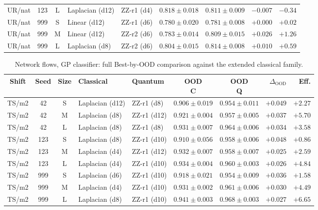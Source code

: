 \documentclass[journal]{IEEEtran}
\begin{document}
\begin{table}[!t]
\begin{tabular}{@{}ccc ll cc rr@{}}
UR/nat & 123 & L & Laplacian (d12) & ZZ-r1 (d4) & $0.818\pm0.018$ & $0.811\pm0.009$ & $-0.007$ & $-0.34$ \\
UR/nat & 999 & S & Linear (d12) & ZZ-r1 (d6) & $0.780\pm0.020$ & $0.781\pm0.008$ & $+0.000$ & $+0.02$ \\
UR/nat & 999 & M & Linear (d12) & ZZ-r2 (d6) & $0.783\pm0.014$ & $0.809\pm0.015$ & $+0.026$ & $+1.26$ \\
UR/nat & 999 & L & Laplacian (d8) & ZZ-r2 (d6) & $0.804\pm0.015$ & $0.814\pm0.008$ & $+0.010$ & $+0.59$ \\\bottomrule
\end{tabular}
\end{table}

\begin{table}[!t]
\centering
\caption{Network flows, GP classifier: full Best-by-OOD comparison against the extended classical family.}
\label{app:netflow_gpc}
\scriptsize
\setlength{\tabcolsep}{2pt}
\begin{tabular}{@{}ccc ll cc rr@{}}
\toprule
Shift & Seed & Size & Classical & Quantum & \shortstack{OOD\\C} & \shortstack{OOD\\Q} & $\Delta_{\mathrm{OOD}}$ & Eff. \\
\midrule
TS/m2 & 42 & S & Laplacian (d12) & ZZ-r1 (d8) & $0.906\pm0.019$ & $0.954\pm0.011$ & $+0.049$ & $+2.27$ \\
TS/m2 & 42 & M & Laplacian (d8) & ZZ-r1 (d12) & $0.921\pm0.004$ & $0.957\pm0.005$ & $+0.037$ & $+5.70$ \\
TS/m2 & 42 & L & Laplacian (d8) & ZZ-r1 (d8) & $0.931\pm0.007$ & $0.964\pm0.006$ & $+0.034$ & $+3.58$ \\
TS/m2 & 123 & S & Laplacian (d8) & ZZ-r1 (d10) & $0.910\pm0.056$ & $0.958\pm0.006$ & $+0.048$ & $+0.86$ \\
TS/m2 & 123 & M & Laplacian (d4) & ZZ-r1 (d12) & $0.932\pm0.007$ & $0.958\pm0.007$ & $+0.025$ & $+2.59$ \\
TS/m2 & 123 & L & Laplacian (d4) & ZZ-r1 (d10) & $0.934\pm0.004$ & $0.960\pm0.003$ & $+0.026$ & $+4.84$ \\
TS/m2 & 999 & S & Laplacian (d6) & ZZ-r1 (d10) & $0.918\pm0.021$ & $0.954\pm0.009$ & $+0.036$ & $+1.58$ \\
TS/m2 & 999 & M & Laplacian (d4) & ZZ-r1 (d10) & $0.931\pm0.002$ & $0.961\pm0.006$ & $+0.030$ & $+4.49$ \\
TS/m2 & 999 & L & Laplacian (d8) & ZZ-r1 (d10) & $0.941\pm0.003$ & $0.968\pm0.003$ & $+0.027$ & $+6.65$ \\

\end{tabular}
\end{table}
\end{document}
